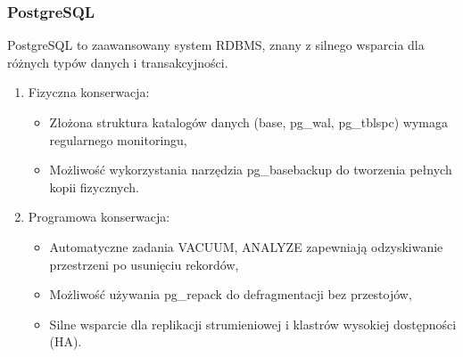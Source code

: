 \documentclass[a4paper,11pt,openany,english]{sphinxmanual}
\begin{document}
\subsubsection{PostgreSQL}
\label{\detokenize{rozdzial2/Kontrola_i_konserwacja/kontrola_i_konserwacja:postgresql}}
\sphinxAtStartPar
PostgreSQL to zaawansowany system RDBMS, znany z silnego wsparcia dla różnych typów danych i transakcyjności.
\begin{enumerate}
%
\item {} 
\sphinxAtStartPar
Fizyczna konserwacja:
\begin{itemize}
\item {} 
\sphinxAtStartPar
Złożona struktura katalogów danych (base, pg\_wal, pg\_tblspc) \textendash{} wymaga regularnego monitoringu,

\item {} 
\sphinxAtStartPar
Możliwość wykorzystania narzędzia pg\_basebackup do tworzenia pełnych kopii fizycznych.

\end{itemize}

\item {} 
\sphinxAtStartPar
Programowa konserwacja:
\begin{itemize}
\item {} 
\sphinxAtStartPar
Automatyczne zadania VACUUM, ANALYZE \textendash{} zapewniają odzyskiwanie przestrzeni po usunięciu rekordów,

\item {} 
\sphinxAtStartPar
Możliwość używania pg\_repack do defragmentacji bez przestojów,

\item {} 
\sphinxAtStartPar
Silne wsparcie dla replikacji strumieniowej i klastrów wysokiej dostępności (HA).

\end{itemize}

\end{enumerate}
\end{document}
